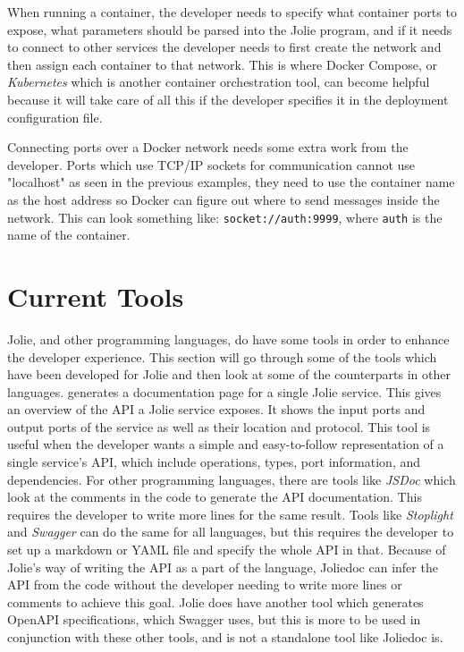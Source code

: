 When running a container, the developer needs to specify what container ports to expose, what parameters should be parsed into the Jolie program, and if it needs to connect to other services the developer needs to first create the network and then assign each container to that network.
This is where Docker Compose, or \textit{Kubernetes} which is another container orchestration tool, can become helpful because it will take care of all this if the developer specifies it in the deployment configuration file.

Connecting ports over a Docker network needs some extra work from the developer. Ports which use TCP/IP sockets for communication cannot use "localhost" as seen in the previous examples, they need to use the container name as the host address so Docker can figure out where to send messages inside the network.
This can look something like: \texttt{socket://auth:9999}, where \texttt{auth} is the name of the container.

\section{Current Tools}
Jolie, and other programming languages, do have some tools in order to enhance the developer experience. This section will go through some of the tools
which have been developed for Jolie and then look at some of the counterparts in other languages.
%
 generates a documentation page for a single Jolie service. This gives an overview of the API a Jolie service exposes. It shows the input ports and output ports of the service as well as their location and protocol.
This tool is useful when the developer wants a simple and easy-to-follow representation of a single service's API, which include operations, types, port information, and dependencies.
For other programming languages, there are tools like \textit{JSDoc} which look at the comments in the code to generate the API documentation. This requires the developer to write more lines for the same result.
Tools like \textit{Stoplight} and \textit{Swagger} can do the same for all languages, but this requires the developer to set up a markdown or YAML file and specify the whole API in that.
Because of Jolie's way of writing the API as a part of the language, Joliedoc can infer the API from the code without the developer needing to write more lines or comments to achieve this goal.
Jolie does have another tool which generates OpenAPI specifications, which Swagger uses, but this is more to be used in conjunction with these other tools, and is not a standalone tool like Joliedoc is.
